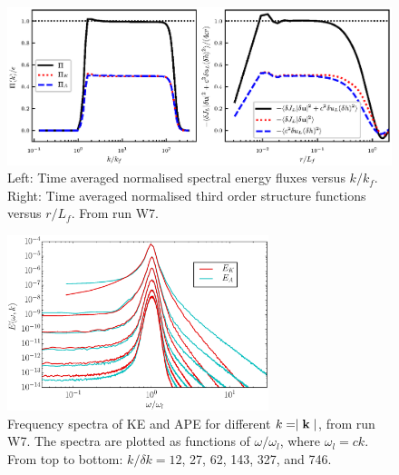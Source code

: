\begin{figure}
\centerline{\includegraphics[]{paper_04_shallow_water/Pyfig/fig3}}
\caption{Left: Time averaged normalised spectral energy fluxes versus $ k/k_f
$. Right: Time averaged normalised third order structure functions versus $
r/L_f $. From run W7. }
\label{Flux}
\end{figure}


\begin{figure}
\centerline{\includegraphics[width=3in]{paper_04_shallow_water/Pyfig/fig4}}
\caption{Frequency spectra of KE and APE for different $ k = \mid {\bf k} \mid
$, from run W7. The spectra are plotted as functions of $\omega/\omega_l$,
where $\omega_l = c k$. From top to bottom: $ k /\delta k = 12$, 27, 62, 143,
327, and 746. }
\label{fig_spatiotemp_spectra}
\end{figure}

